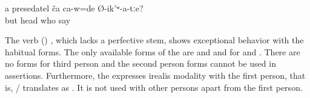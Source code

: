  
\begin{exe}
	
	\ex	\label{ex:Who did you say was the head}
	\gll	a	presedatel	ča 	ca-w=de	Ø-ik'ʷ-a-tːe?\\
		but	head	who		say\\
	\glt	{}
\end{exe}

The verb  () , which lacks a perfective stem, shows exceptional behavior with the habitual forms. The only available forms of the  are   and   and for    and  . There are no forms for third person and the second person forms cannot be used in assertions. Furthermore, the  expresses irealis modality with the first person, that is, \slash{} translates as . It is not used with other persons apart from the first person.


